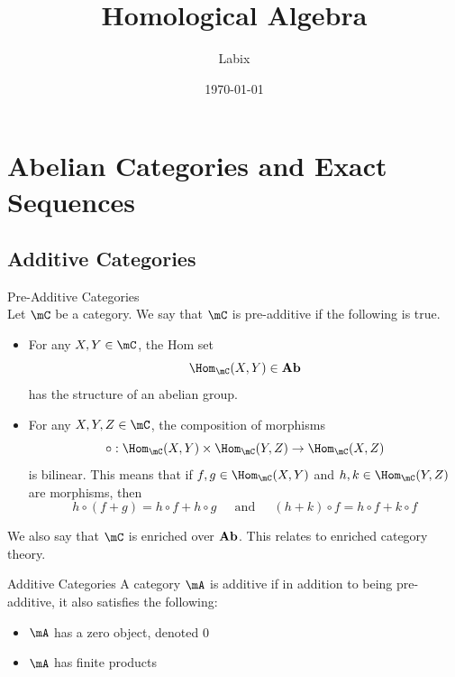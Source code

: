 \documentclass[a4paper]{article}
\title{Homological Algebra}
\author{Labix}
\date{\today}
\begin{document}
\maketitle
\begin{abstract}
\end{abstract}
\pagebreak
\tableofcontents

\pagebreak
\section{Abelian Categories and Exact Sequences}
\subsection{Additive Categories}
\begin{defn}{Pre-Additive Categories}{}\\
Let $\mC$ be a category. We say that $\mC$ is pre-additive if the following is true. 
\begin{itemize}
\item For any $X,Y\in\mC$, the Hom set $$\Hom_\mC(X,Y)\in\bold{Ab}$$ has the structure of an abelian group. 
\item For any $X,Y,Z\in\mC$, the composition of morphisms $$\circ:\Hom_\mC(X,Y)\times\Hom_\mC(Y,Z)\to\Hom_\mC(X,Z)$$ is bilinear. This means that if $f,g\in\Hom_\mC(X,Y)$ and $h,k\in\Hom_\mC(Y,Z)$ are morphisms, then $$h\circ(f+g)=h\circ f+h\circ g\;\;\;\;\text{ and }\;\;\;\;(h+k)\circ f=h\circ f+k\circ f$$
\end{itemize}
\end{defn}

We also say that $\mC$ is enriched over $\bold{Ab}$. This relates to enriched category theory. 

\begin{defn}{Additive Categories}{} A category $\mA$ is additive if in addition to being pre-additive, it also satisfies the following: 
\begin{itemize}
\item $\mA$ has a zero object, denoted $0$
\item $\mA$ has finite products
\end{itemize}
\end{defn}
\end{document}
